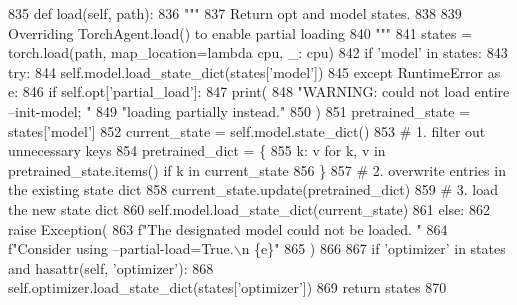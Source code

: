 \begin{DoxyCode}
835     \textcolor{keyword}{def }load(self, path):
836         \textcolor{stringliteral}{"""}
837 \textcolor{stringliteral}{        Return opt and model states.}
838 \textcolor{stringliteral}{}
839 \textcolor{stringliteral}{        Overriding TorchAgent.load() to enable partial loading}
840 \textcolor{stringliteral}{        """}
841         states = torch.load(path, map\_location=\textcolor{keyword}{lambda} cpu, \_: cpu)
842         \textcolor{keywordflow}{if} \textcolor{stringliteral}{'model'} \textcolor{keywordflow}{in} states:
843             \textcolor{keywordflow}{try}:
844                 self.model.load\_state\_dict(states[\textcolor{stringliteral}{'model'}])
845             \textcolor{keywordflow}{except} RuntimeError \textcolor{keyword}{as} e:
846                 \textcolor{keywordflow}{if} self.opt[\textcolor{stringliteral}{'partial\_load'}]:
847                     print(
848                         \textcolor{stringliteral}{"WARNING: could not load entire --init-model; "}
849                         \textcolor{stringliteral}{"loading partially instead."}
850                     )
851                     pretrained\_state = states[\textcolor{stringliteral}{'model'}]
852                     current\_state = self.model.state\_dict()
853                     \textcolor{comment}{# 1. filter out unnecessary keys}
854                     pretrained\_dict = \{
855                         k: v \textcolor{keywordflow}{for} k, v \textcolor{keywordflow}{in} pretrained\_state.items() \textcolor{keywordflow}{if} k \textcolor{keywordflow}{in} current\_state
856                     \}
857                     \textcolor{comment}{# 2. overwrite entries in the existing state dict}
858                     current\_state.update(pretrained\_dict)
859                     \textcolor{comment}{# 3. load the new state dict}
860                     self.model.load\_state\_dict(current\_state)
861                 \textcolor{keywordflow}{else}:
862                     \textcolor{keywordflow}{raise} Exception(
863                         f\textcolor{stringliteral}{"The designated model could not be loaded. "}
864                         f\textcolor{stringliteral}{"Consider using --partial-load=True.\(\backslash\)n \{e\}"}
865                     )
866 
867         \textcolor{keywordflow}{if} \textcolor{stringliteral}{'optimizer'} \textcolor{keywordflow}{in} states \textcolor{keywordflow}{and} hasattr(self, \textcolor{stringliteral}{'optimizer'}):
868             self.optimizer.load\_state\_dict(states[\textcolor{stringliteral}{'optimizer'}])
869         \textcolor{keywordflow}{return} states
870 
\end{DoxyCode}

